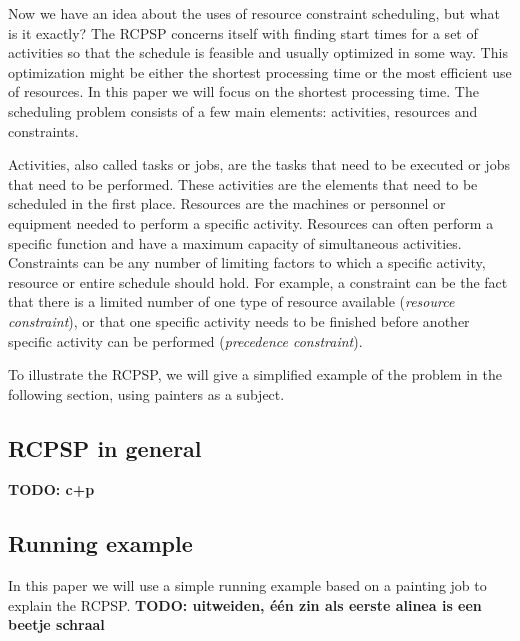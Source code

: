 \documentclass{article}
\theoremstyle{definition}
\newcommand{\TODO}[1]{{\color{red}\textbf{TODO: #1}}}
\begin{document}
Now we have an idea about the uses of resource constraint scheduling, but what is it exactly?
The RCPSP concerns itself with finding start times for a set of activities so that the schedule is feasible and usually optimized in some way.
This optimization might be either the shortest processing time or the most efficient use of resources.
In this paper we will focus on the shortest processing time.
The scheduling problem consists of a few main elements: activities, resources and constraints.

Activities, also called tasks or jobs, are the tasks that need to be executed or jobs that need to be performed.
These activities are the elements that need to be scheduled in the first place.
Resources are the machines or personnel or equipment needed to perform a specific activity.
Resources can often perform a specific function and have a maximum capacity of simultaneous activities.
Constraints can be any number of limiting factors to which a specific activity, resource or entire schedule should hold.
For example, a constraint can be the fact that there is a limited number of one type of resource available (\emph{resource constraint}), or that one specific activity needs to be finished before another specific activity can be performed (\emph{precedence constraint}).

To illustrate the RCPSP, we will give a simplified example of the problem in the following section, using painters as a subject.

\subsection{RCPSP in general}

\TODO{c+p}

\subsection{Running example}
In this paper we will use a simple running example based on a painting job to explain the RCPSP. \TODO{uitweiden, \'e\'en zin als eerste alinea is een beetje schraal}
\end{document}

